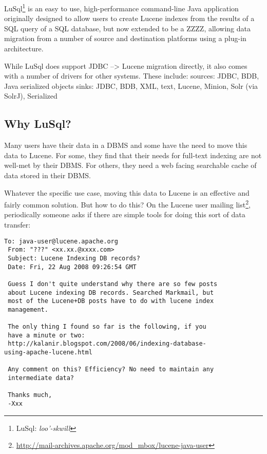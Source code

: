 
LuSql\footnote{LuSql: {\em loo'-skwill}} is an easy to use, high-performance
command-line Java application originally designed to allow users to create
Lucene indexes from the results of a SQL query of a SQL database, but now
extended to be a ZZZZ, allowing data migration from a number of source and
destination platforms using a plug-in architecture.

While LuSql does support JDBC --> Lucene migration directly, it also comes
with a number of drivers for other systems.
These include:
sources:
JDBC, BDB, Java serialized objects
sinks:
JDBC, BDB, XML, text, Lucene, Minion, Solr (via SolrJ), Serialized



\subsection{Why LuSql?}
Many users have their data in a DBMS and some have the need to move
this data to Lucene.
For some, they find that their needs for full-text indexing are not well-met
by their DBMS. 
For others, they need a web facing searchable cache of data stored in their
DBMS.  

Whatever the specific use case, moving this data to Lucene is an effective and
fairly common solution.  
But how to do this?
On the Lucene user mailing
list\footnote{\url{http://mail-archives.apache.org/mod_mbox/lucene-java-user}},
periodically someone asks if there are simple tools for doing this sort of
data transfer:
\begin{lstlisting}[backgroundcolor=\color{grey}]
 To: java-user@lucene.apache.org
 From: "???" <xx.xx.@xxxx.com>
 Subject: Lucene Indexing DB records?
 Date: Fri, 22 Aug 2008 09:26:54 GMT
  
 Guess I don't quite understand why there are so few posts 
 about Lucene indexing DB records. Searched Markmail, but 
 most of the Lucene+DB posts have to do with lucene index 
 management. 
  
 The only thing I found so far is the following, if you 
 have a minute or two:
 http://kalanir.blogspot.com/2008/06/indexing-database-
using-apache-lucene.html
  
 Any comment on this? Efficiency? No need to maintain any 
 intermediate data?
  
 Thanks much,
 -Xxx
\end{lstlisting}


